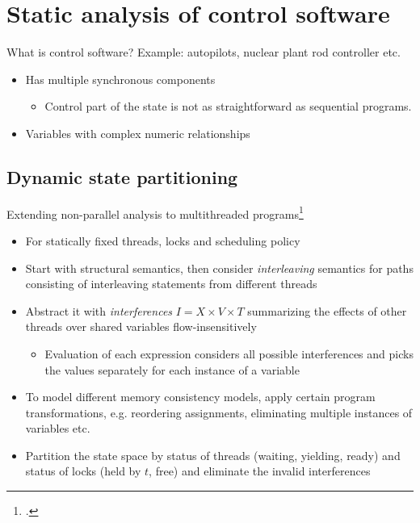 \documentclass[aspectratio=169]{beamer}
\begin{document}
\section{Static analysis of control software}
\begin{frame}{What is control software?}
  Example: autopilots, nuclear plant rod controller etc.
  
  \begin{itemize}
  \item<2-> Has multiple synchronous components\pause
    \begin{itemize}
    \item<3-> Control part of the state is not as straightforward as sequential programs. 
    \end{itemize}
  \item<5-> Variables with complex numeric relationships
  \end{itemize}
\end{frame}

\subsection{Dynamic state partitioning}
\begin{frame}{}
\end{frame}

\begin{frame}{Extending non-parallel analysis to multithreaded programs\footcite{mine2011static}}
  \footnotesize
  \begin{itemize}[<+->]
  \item For statically fixed threads, locks and scheduling policy
  \item Start with structural semantics, then consider \emph{interleaving} semantics for paths consisting of interleaving statements from different threads
  \item Abstract it with \emph{interferences} $I = X \times V \times T$ summarizing the effects of other threads over shared variables flow-insensitively
    \begin{itemize}[<+->]\footnotesize
    \item Evaluation of each expression considers all possible interferences and picks the values separately for each instance of a variable
    \end{itemize}
  \item To model different memory consistency models, apply certain program transformations, e.g. reordering assignments, eliminating multiple instances of variables etc.
  \item Partition the state space by status of threads (waiting, yielding, ready) and status of locks (held by $t$, free) and eliminate the invalid interferences
  \end{itemize}
\end{frame}
\end{document}
